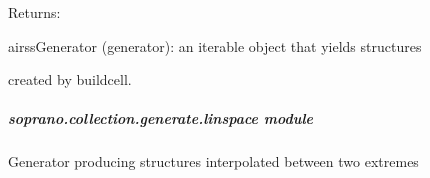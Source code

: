 \documentclass[letterpaper,10pt,english]{sphinxmanual}
\begin{document}
\begin{fulllineitems}
\begin{DUlineblock}{0em}
\item[] Returns:
\item[]
\begin{DUlineblock}{\DUlineblockindent}
\item[] airssGenerator (generator): an iterable object that yields structures
\item[]
\begin{DUlineblock}{\DUlineblockindent}
\item[] created by buildcell.
\end{DUlineblock}
\end{DUlineblock}
\end{DUlineblock}

\end{fulllineitems}



\subparagraph{soprano.collection.generate.linspace module}
\label{doctree/soprano.collection.generate.linspace::doc}\label{doctree/soprano.collection.generate.linspace:soprano-collection-generate-linspace-module}\label{doctree/soprano.collection.generate.linspace:module-soprano.collection.generate.linspace}
Generator producing structures interpolated between two extremes
\end{document}
